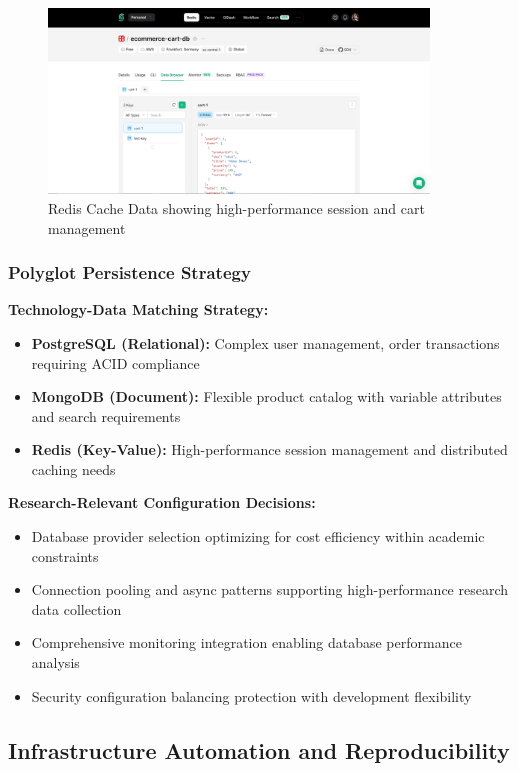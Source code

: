 \begin{figure}[H]
\centering
\includegraphics[width=0.9\textwidth]{figures/chapter5/redis-cache-data.png}
\caption{Redis Cache Data showing high-performance session and cart management}
\label{fig:redis-cache-data}
\end{figure}

\subsubsection{Polyglot Persistence Strategy}

\textbf{Technology-Data Matching Strategy:}
\begin{itemize}
\item \textbf{PostgreSQL (Relational):} Complex user management, order transactions requiring ACID compliance
\item \textbf{MongoDB (Document):} Flexible product catalog with variable attributes and search requirements
\item \textbf{Redis (Key-Value):} High-performance session management and distributed caching needs
\end{itemize}

\textbf{Research-Relevant Configuration Decisions:}
\begin{itemize}
\item Database provider selection optimizing for cost efficiency within academic constraints
\item Connection pooling and async patterns supporting high-performance research data collection
\item Comprehensive monitoring integration enabling database performance analysis
\item Security configuration balancing protection with development flexibility
\end{itemize}

\subsection{Infrastructure Automation and Reproducibility}

